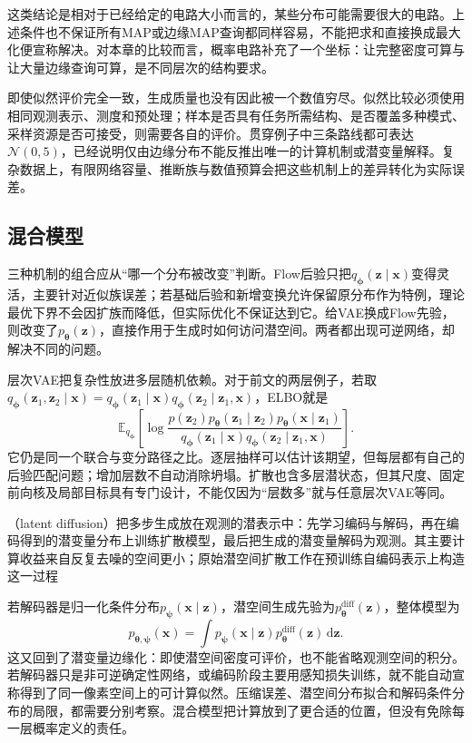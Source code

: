 这类结论是相对于已经给定的电路大小而言的，某些分布可能需要很大的电路。上述条件也不保证所有MAP或边缘MAP查询都同样容易，不能把求和直接换成最大化便宣称解决。对本章的比较而言，概率电路补充了一个坐标：让完整密度可算与让大量边缘查询可算，是不同层次的结构要求。

即使似然评价完全一致，生成质量也没有因此被一个数值穷尽。似然比较必须使用相同观测表示、测度和预处理；样本是否具有任务所需结构、是否覆盖多种模式、采样资源是否可接受，则需要各自的评价。贯穿例子中三条路线都可表达$\mathcal{N}(0,5)$，已经说明仅由边缘分布不能反推出唯一的计算机制或潜变量解释。复杂数据上，有限网络容量、推断族与数值预算会把这些机制上的差异转化为实际误差。

\subsection{混合模型}
\label{sec:pgm-generative-hybrids}

三种机制的组合应从“哪一个分布被改变”判断。Flow后验只把$q_{\bm{\phi}}(\bm{z}\mid\bm{x})$变得灵活，主要针对近似族误差；若基础后验和新增变换允许保留原分布作为特例，理论最优下界不会因扩族而降低，但实际优化不保证达到它。给VAE换成Flow先验，则改变了$p_{\bm{\theta}}(\bm{z})$，直接作用于生成时如何访问潜空间。两者都出现可逆网络，却解决不同的问题。

层次VAE把复杂性放进多层随机依赖。对于前文的两层例子，若取$q_{\bm{\phi}}(\bm{z}_1,\bm{z}_2\mid\bm{x})=q_{\bm{\phi}}(\bm{z}_1\mid\bm{x})q_{\bm{\phi}}(\bm{z}_2\mid\bm{z}_1,\bm{x})$，ELBO就是
\[
  \mathbb{E}_{q_{\bm{\phi}}}
  \left[
    \log\frac{
      p(\bm{z}_2)p_{\bm{\theta}}(\bm{z}_1\mid\bm{z}_2)
          p_{\bm{\theta}}(\bm{x}\mid\bm{z}_1)}
      {q_{\bm{\phi}}(\bm{z}_1\mid\bm{x})
          q_{\bm{\phi}}(\bm{z}_2\mid\bm{z}_1,\bm{x})}
  \right].
\]
它仍是同一个联合与变分路径之比。逐层抽样可以估计该期望，但每层都有自己的后验匹配问题；增加层数不自动消除坍塌。扩散也含多层潜状态，但其尺度、固定前向核及局部目标具有专门设计，不能仅因为“层数多”就与任意层次VAE等同。

（latent diffusion）把多步生成放在观测的潜表示中：先学习编码与解码，再在编码得到的潜变量分布上训练扩散模型，最后把生成的潜变量解码为观测。其主要计算收益来自反复去噪的空间更小；原始潜空间扩散工作在预训练自编码表示上构造这一过程

若解码器是归一化条件分布$p_{\bm{\psi}}(\bm{x}\mid\bm{z})$，潜空间生成先验为$p_{\bm{\theta}}^{\mathrm{diff}}(\bm{z})$，整体模型为
\begin{equation}
  \label{eq:pgm-generative-latent-diffusion}
  p_{\bm{\theta},\bm{\psi}}(\bm{x})
  =\int p_{\bm{\psi}}(\bm{x}\mid\bm{z})
          p_{\bm{\theta}}^{\mathrm{diff}}(\bm{z})\,\mathrm{d}\bm{z}.
\end{equation}
这又回到了潜变量边缘化：即使潜空间密度可评价，也不能省略观测空间的积分。若解码器只是非可逆确定性网络，或编码阶段主要用感知损失训练，就不能自动宣称得到了同一像素空间上的可计算似然。压缩误差、潜空间分布拟合和解码条件分布的局限，都需要分别考察。混合模型把计算放到了更合适的位置，但没有免除每一层概率定义的责任。

